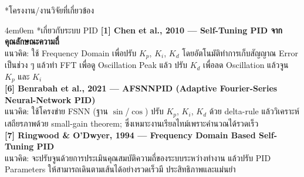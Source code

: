 \documentclass[14pt, fleqn, a4paper]{extarticle}
\makeatletter
\renewcommand\subsection{%
  \@ifstar{\flatsubsection}{\@subsection}%
}
\newcommand{\flatsubsection}[1]{%
   \par\medskip
   {\bfseries #1\par}
}
\renewcommand\subsubsection{%
  \@ifstar{\flatsubsubsection}{\@subsubsection}%
}
\newcommand{\flatsubsubsection}[1]{%
   \par\medskip\noindent
   {\bfseries #1\par}
}
\makeatother
\begin{document}
\subsection*{โครงงาน/งานวิจัยที่เกี่ยวข้อง} \vspace{-1em}
\begin{adjustwidth}{4em}{0em}
	\subsubsection*{เกี่ยวกับระบบ PID} \vspace{-0.75em}
	\noindent \textbf{[1] Chen et al., 2010 — Self-Tuning PID จากคุณลักษณะความถี่} \\
		\indent แนวคิด: ใช้ Frequency Domain เพื่อปรับ $K_p$, $K_i$, $K_d$ โดยอัตโนมัติทำการเก็บสัญญาณ Error เป็นช่วง ๆ แล้วทำ FFT เพื่อดู Oscillation Peak แล้ว ปรับ $K_d $ เพื่อลด Oscillation แล้วจูน $K_p$      และ $K_i$ \\
	\textbf{[6] Benrabah et al., 2021 — AFSNNPID (Adaptive Fourier-Series Neural-Network PID)} \\
		\indent แนวคิด: ใช้โครงข่าย FSNN (ฐาน $\sin$/$\cos$) ปรับ $K_p$, $K_i$, $K_d$ ด้วย delta-rule แล้ววิเคราะห์เสถียรภาพด้วย small-gain theorem; ซึ่งเหมาะงานเรียลไทม์เพราะคำนวณได้รวดเร็ว \\
	\textbf{[7] Ringwood \& O’Dwyer, 1994 — Frequency Domain Based Self-Tuning PID} \\
		\indent แนวคิด: จะปรับจูนด้วยการประเมินคุณสมบัติความถี่ของระบบระหว่างทำงาน แล้วปรับ PID Parameters ให้สามารถเดินตามเส้นได้อย่างรวดเร็วมี ประสิทธิภาพและแม่นยำ


\end{adjustwidth}
\end{document}

